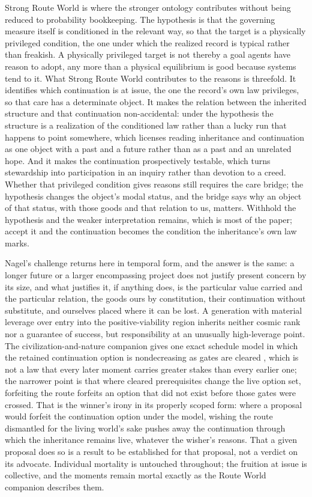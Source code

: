 Strong Route World is where the stronger ontology contributes without being
reduced to probability bookkeeping. The hypothesis is that the governing measure itself is
conditioned in the relevant way, so that the target is a physically privileged
condition, the one under which the realized record is typical rather than
freakish. A physically privileged target is not thereby a goal agents have
reason to adopt, any more than a physical equilibrium is good because systems
tend to it. What Strong Route
World contributes to the reasons is threefold. It identifies which
continuation is at issue, the one the record's own law privileges, so that
care has a determinate object. It makes the relation between the inherited
structure and that continuation non-accidental: under the hypothesis the
structure is a realization of the conditioned law rather than a lucky run
that happens to point somewhere, which licenses reading inheritance and
continuation as one object with a past and a future rather than as a past and
an unrelated hope. And it makes the continuation prospectively testable, which
turns stewardship into participation in an inquiry rather than devotion to a
creed. Whether that
privileged condition gives reasons still requires the care bridge; the
hypothesis changes the object's modal status, and the bridge says why an
object of that status, with those goods and that relation to us, matters.
Withhold the hypothesis and the weaker interpretation remains, which is most
of the paper; accept it and the continuation becomes the condition the
inheritance's own law marks.

Nagel's challenge returns here in temporal form, and the answer is the same:
a longer future or a larger encompassing project does not justify present
concern by its size, and what justifies it, if anything does, is the
particular value carried and the particular relation, the goods ours by
constitution, their continuation without substitute, and ourselves placed
where it can be lost. A generation with material leverage over entry into the
positive-viability region inherits neither cosmic rank nor a guarantee of
success, but responsibility at an unusually high-leverage point. The
civilization-and-nature companion gives one exact schedule model in which the
retained continuation option is nondecreasing as gates are cleared
\cite{GoldenCivNature}, which is not a law that every later moment carries
greater stakes than every earlier one; the narrower point is that where
cleared prerequisites change the live option set, forfeiting the route
forfeits an option that did not exist before those gates were crossed. That is the winner's irony in its
properly scoped form: where a proposal would forfeit the continuation option
under the model, wishing the route dismantled for the living world's sake
pushes away the continuation through which the inheritance remains live,
whatever the wisher's reasons. That a given proposal does so is a result to be
established for that proposal, not a verdict on its advocate. Individual mortality is untouched
throughout; the fruition at issue is collective, and the moments remain mortal
exactly as the Route World companion describes them.


